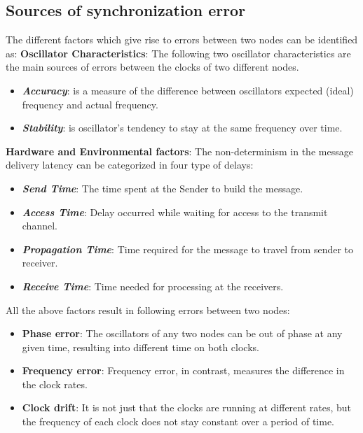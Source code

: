 \documentclass[journal]{IEEEtran}
\begin{document}
\subsection{\textbf{Sources of synchronization error}}\noindent
The different factors which give rise to errors between two nodes can be identified as:\newline
\textbf{Oscillator Characteristics}: The following two oscillator characteristics are the main sources of errors between the clocks of two different nodes.
         \begin{itemize}
         \item \emph{\textbf{Accuracy}}: is a measure of the difference between oscillators expected (ideal)
           frequency and actual frequency.
         \item \emph{\textbf{Stability}}: is oscillator's tendency to stay at the same frequency over
           time.
      \end{itemize}
\textbf{Hardware and Environmental factors}: The non-determinism in the message delivery latency can be categorized in four type of delays:
      \begin{itemize}
         \item \emph{\textbf{Send Time}}: The time spent at the Sender to build the message.
         \item \emph{\textbf{Access Time}}: Delay occurred while waiting for access to the transmit channel.
         \item \emph{\textbf{Propagation Time}}: Time required for the message to travel from sender to receiver.
         \item \emph{\textbf{Receive Time}}: Time needed for processing at the receivers.
      \end{itemize}
All the above factors result in following errors between two nodes:
\begin{itemize}
\item \textbf{Phase error}: The oscillators of any two nodes can be out of phase at any given time, resulting into different time on both clocks.
\item \textbf{Frequency error}: Frequency error, in contrast, measures the difference in the clock rates.
\item \textbf{Clock drift}: It is not just that the clocks are running at different rates, but the frequency of each clock does not stay constant over a period of time.
\end{itemize}
\end{document}
